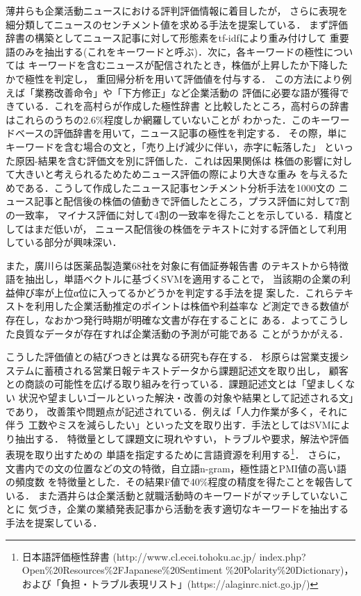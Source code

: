 \documentclass[twocolumn]{jarticle}
\begin{document}
薄井ら\cite{usui2014}も企業活動ニュースにおける評判評価情報に着目したが，
さらに表現を細分類してニュースのセンチメント値を求める手法を提案している．
まず評価辞書の構築としてニュース記事に対して形態素をtf-idfにより重み付けして
重要語のみを抽出する(これをキーワードと呼ぶ)．次に，各キーワードの極性については
キーワードを含むニュースが配信されたとき，株価が上昇したか下降したかで極性を判定し，
重回帰分析を用いて評価値を付与する．
この方法により例えば「業務改善命令」や「下方修正」など企業活動の
評価に必要な語が獲得できている．これを高村らが作成した極性辞書\cite{takamura05}
と比較したところ，高村らの辞書はこれらのうちの2.6\%程度しか網羅していないことが
わかった．このキーワードベースの評価辞書を用いて，ニュース記事の極性を判定する．
その際，単にキーワードを含む場合の文と，「売り上げ減少に伴い，赤字に転落した」
といった原因-結果を含む評価文を別に評価した．これは因果関係は
株価の影響に対して大きいと考えられるためためニュース評価の際により大きな重み
を与えるためである．こうして作成したニュース記事センチメント分析手法を1000文の
ニュース記事と配信後の株価の値動きで評価したところ，プラス評価に対して7割の一致率，
マイナス評価に対して4割の一致率を得たことを示している．精度としてはまだ低いが，
ニュース配信後の株価をテキストに対する評価として利用している部分が興味深い．

また，廣川\cite{hirokawa2013}らは医薬品製造業68社を対象に有価証券報告書
のテキストから特徴語を抽出し，単語ベクトルに基づくSVMを適用することで，
当該期の企業の利益伸び率が上位α位に入ってるかどうかを判定する手法を提
案した．これらテキストを利用した企業活動推定のポイントは株価や利益率な
ど測定できる数値が存在し，なおかつ発行時期が明確な文書が存在することに
ある．よってこうした良質なデータが存在すれば企業活動の予測が可能である
ことがうかがえる．

こうした評価値との結びつきとは異なる研究も存在する．
杉原ら\cite{sugihara2012}は営業支援システムに蓄積される営業日報テキストデータから課題記述文を取り出し，
顧客との商談の可能性を広げる取り組みを行っている．課題記述文とは「望ましくない
状況や望ましいゴールといった解決・改善の対象や結果として記述される文」であり，
改善策や問題点が記述されている．例えば「人力作業が多く，それに伴う
工数やミスを減らしたい」といった文を取り出す．手法としてはSVMにより抽出する．
特徴量として課題文に現れやすい，トラブルや要求，解法や評価表現を取り出すための
単語を指定するために言語資源を利用する\footnote{日本語評価極性辞書
(http://www.cl.ecei.tohoku.ac.jp/
index.php?Open\%20Resources\%2FJapanese\%20Sentiment
\%20Polarity\%20Dictionary)，
および「負担・トラブル表現リスト」(https://alaginrc.nict.go.jp/)}．
さらに，文書内での文の位置などの文の特徴，自立語n-gram，極性語とPMI値の高い語の頻度数
を特徴量とした．その結果F値で40\%程度の精度を得たことを報告している．
また酒井\cite{sakai2014}らは企業活動と就職活動時のキーワードがマッチしていないことに
気づき，企業の業績発表記事から活動を表す適切なキーワードを抽出する手法を提案している．
\end{document}
